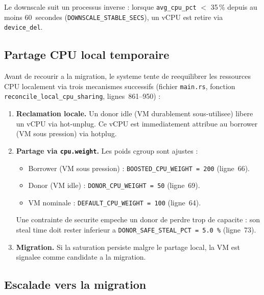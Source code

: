 Le downscale suit un processus inverse : lorsque \texttt{avg\_cpu\_pct} $<$ 35\,\% depuis au moins 60~secondes (\texttt{DOWNSCALE\_STABLE\_SECS}), un vCPU est retire via \texttt{device\_del}.

\subsection{Partage CPU local temporaire}
\label{subsec:partage-cpu}

Avant de recourir a la migration, le systeme tente de reequilibrer les ressources CPU localement via trois mecanismes successifs (fichier \texttt{main.rs}, fonction \texttt{reconcile\_local\_cpu\_sharing}, lignes~861--950) :

\begin{enumerate}
    \item \textbf{Reclamation locale.} Un donor idle (VM durablement sous-utilisee) libere un vCPU via hot-unplug. Ce vCPU est immediatement attribue au borrower (VM sous pression) via hotplug.
    \item \textbf{Partage via \texttt{cpu.weight}.} Les poids cgroup sont ajustes :
    \begin{itemize}
        \item Borrower (VM sous pression) : \texttt{BOOSTED\_CPU\_WEIGHT = 200} (ligne~66).
        \item Donor (VM idle) : \texttt{DONOR\_CPU\_WEIGHT = 50} (ligne~69).
        \item VM nominale : \texttt{DEFAULT\_CPU\_WEIGHT = 100} (ligne~64).
    \end{itemize}
    Une contrainte de securite empeche un donor de perdre trop de capacite : son steal time doit rester inferieur a \texttt{DONOR\_SAFE\_STEAL\_PCT = 5.0\,\%} (ligne~73).
    \item \textbf{Migration.} Si la saturation persiste malgre le partage local, la VM est signalee comme candidate a la migration.
\end{enumerate}

\subsection{Escalade vers la migration}
\label{subsec:escalade-migration}

